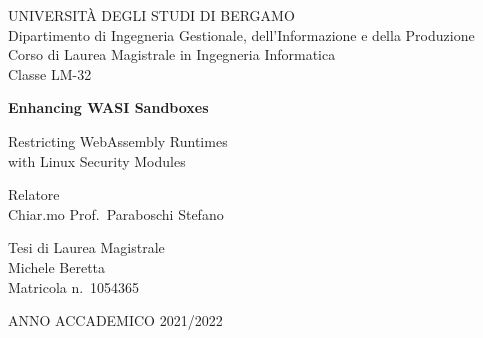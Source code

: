 \begin{titlepage}
  \begin{center}
    \large
    UNIVERSITÀ DEGLI STUDI DI BERGAMO \\
    \vspace{0.5cm}
    \normalsize
    Dipartimento di Ingegneria Gestionale, dell'Informazione e della Produzione \\
    Corso di Laurea Magistrale in Ingegneria Informatica \\
    Classe LM-32

    \vspace*{3cm}

    \Huge
    \textbf{Enhancing WASI Sandboxes}

    \vspace{0.5cm}
    \LARGE
    Restricting WebAssembly Runtimes \\ with Linux Security Modules
  \end{center}

  \vfill

  \begin{flushleft}
    Relatore \\
    Chiar.mo Prof.\ Paraboschi Stefano
  \end{flushleft}

  \vspace{1cm}

  \begin{flushright}
    Tesi di Laurea Magistrale \\
    Michele Beretta \\
    Matricola n.\ 1054365
  \end{flushright}

  \vfill

  \begin{center}
    ANNO ACCADEMICO 2021/2022
  \end{center}
\end{titlepage}